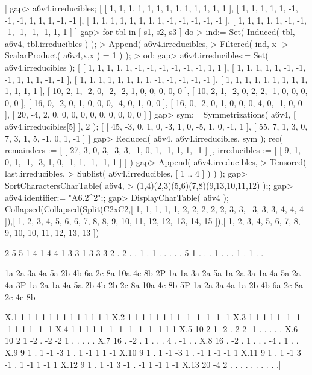 |    gap> a6v4.irreducibles;
    [ [ 1, 1, 1, 1, 1, 1, 1, 1, 1, 1, 1, 1, 1 ],
      [ 1, 1, 1, 1, 1, -1, -1, -1, 1, 1, 1, -1, -1 ],
      [ 1, 1, 1, 1, 1, 1, 1, 1, -1, -1, -1, -1, -1 ],
      [ 1, 1, 1, 1, 1, -1, -1, -1, -1, -1, -1, 1, 1 ] ]
    gap> for tbl in [ s1, s2, s3 ] do
    >      ind:= Set( Induced( tbl, a6v4, tbl.irreducibles ) );
    >      Append( a6v4.irreducibles,
    >              Filtered( ind, x -> ScalarProduct( a6v4,x,x ) = 1 ) );
    >    od;
    gap> a6v4.irreducibles:= Set( a6v4.irreducibles );
    [ [ 1, 1, 1, 1, 1, -1, -1, -1, -1, -1, -1, 1, 1 ],
      [ 1, 1, 1, 1, 1, -1, -1, -1, 1, 1, 1, -1, -1 ],
      [ 1, 1, 1, 1, 1, 1, 1, 1, -1, -1, -1, -1, -1 ],
      [ 1, 1, 1, 1, 1, 1, 1, 1, 1, 1, 1, 1, 1 ],
      [ 10, 2, 1, -2, 0, -2, -2, 1, 0, 0, 0, 0, 0 ],
      [ 10, 2, 1, -2, 0, 2, 2, -1, 0, 0, 0, 0, 0 ],
      [ 16, 0, -2, 0, 1, 0, 0, 0, -4, 0, 1, 0, 0 ],
      [ 16, 0, -2, 0, 1, 0, 0, 0, 4, 0, -1, 0, 0 ],
      [ 20, -4, 2, 0, 0, 0, 0, 0, 0, 0, 0, 0, 0 ] ]
    gap> sym:= Symmetrizations( a6v4, [ a6v4.irreducibles[5] ], 2 );
    [ [ 45, -3, 0, 1, 0, -3, 1, 0, -5, 1, 0, -1, 1 ],
      [ 55, 7, 1, 3, 0, 7, 3, 1, 5, -1, 0, 1, -1 ] ]
    gap> Reduced( a6v4, a6v4.irreducibles, sym );
    rec(
      remainders := [ [ 27, 3, 0, 3, -3, 3, -1, 0, 1, -1, 1, 1, -1 ] ],
      irreducibles := [ [ 9, 1, 0, 1, -1, -3, 1, 0, -1, 1, -1, -1, 1 ] ] )
    gap> Append( a6v4.irreducibles,
    >            Tensored( last.irreducibles,
    >                      Sublist( a6v4.irreducibles, [ 1 .. 4 ] ) ) );
    gap> SortCharactersCharTable( a6v4,
    >                             (1,4)(2,3)(5,6)(7,8)(9,13,10,11,12) );;
    gap> a6v4.identifier:= "A6.2^2";;
    gap> DisplayCharTable( a6v4 );
    Collapsed(Collapsed(Split(C2xC2,[ 1, 1, 1, 1, 1, 2, 2, 2, 2, 2, 3, 3, \
    3, 3, 3, 4, 4, 4 ]),[ 1, 2, 3, 4, 5, 6, 6, 7, 8, 8, 9, 10, 11, 12, 12,\
     13, 14, 15 ]),[ 1, 2, 3, 4, 5, 6, 7, 8, 9, 10, 10, 11, 12, 13, 13 ])

          2  5  5  1  4  1  4  4  1  3  3   1  3  3
          3  2  .  2  .  .  1  .  1  .  .   .  .  .
          5  1  .  .  .  1  .  .  .  1  .   1  .  .

            1a 2a 3a 4a 5a 2b 4b 6a 2c 8a 10a 4c 8b
         2P 1a 1a 3a 2a 5a 1a 2a 3a 1a 4a  5a 2a 4a
         3P 1a 2a 1a 4a 5a 2b 4b 2b 2c 8a 10a 4c 8b
         5P 1a 2a 3a 4a 1a 2b 4b 6a 2c 8a  2c 4c 8b

    X.1      1  1  1  1  1  1  1  1  1  1   1  1  1
    X.2      1  1  1  1  1  1  1  1 -1 -1  -1 -1 -1
    X.3      1  1  1  1  1 -1 -1 -1  1  1   1 -1 -1
    X.4      1  1  1  1  1 -1 -1 -1 -1 -1  -1  1  1
    X.5     10  2  1 -2  .  2  2 -1  .  .   .  .  .
    X.6     10  2  1 -2  . -2 -2  1  .  .   .  .  .
    X.7     16  . -2  .  1  .  .  .  4  .  -1  .  .
    X.8     16  . -2  .  1  .  .  . -4  .   1  .  .
    X.9      9  1  .  1 -1 -3  1  .  1 -1   1  1 -1
    X.10     9  1  .  1 -1 -3  1  . -1  1  -1 -1  1
    X.11     9  1  .  1 -1  3 -1  .  1 -1   1 -1  1
    X.12     9  1  .  1 -1  3 -1  . -1  1  -1  1 -1
    X.13    20 -4  2  .  .  .  .  .  .  .   .  .  .|

